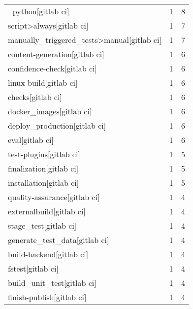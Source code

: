 \begin{tabular}{lrr}
🐍 python[gitlab ci]                        &                   1 &             8 \\
script>always[gitlab ci]                   &                   1 &             7 \\
manually\_triggered\_tests>manual[gitlab ci] &                   1 &             7 \\
content-generation[gitlab ci]              &                   1 &             6 \\
confidence-check[gitlab ci]                &                   1 &             6 \\
linux build[gitlab ci]                     &                   1 &             6 \\
checks[gitlab ci]                          &                   1 &             6 \\
docker\_images[gitlab ci]                   &                   1 &             6 \\
deploy\_production[gitlab ci]               &                   1 &             6 \\
eval[gitlab ci]                            &                   1 &             6 \\
test-plugins[gitlab ci]                    &                   1 &             5 \\
finalization[gitlab ci]                    &                   1 &             5 \\
installation[gitlab ci]                    &                   1 &             5 \\
quality-assurance[gitlab ci]               &                   1 &             4 \\
externalbuild[gitlab ci]                   &                   1 &             4 \\
stage\_test[gitlab ci]                      &                   1 &             4 \\
generate\_test\_data[gitlab ci]              &                   1 &             4 \\
build-backend[gitlab ci]                   &                   1 &             4 \\
fstest[gitlab ci]                          &                   1 &             4 \\
build\_unit\_test[gitlab ci]                 &                   1 &             4 \\
finish-publish[gitlab ci]                  &                   1 &             4 \\

\end{tabular}
